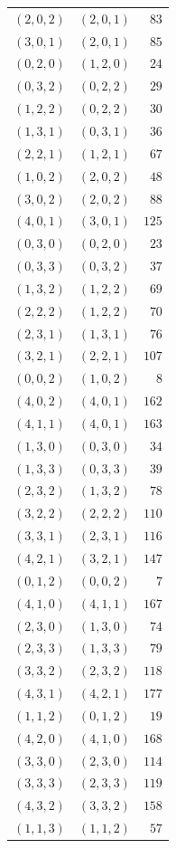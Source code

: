 \begin{longtable}{@{}rrr@{}}
$(2,0,2)$ & $(2,0,1)$ & $83$\\
$(3,0,1)$ & $(2,0,1)$ & $85$\\
$(0,2,0)$ & $(1,2,0)$ & $24$\\
$(0,3,2)$ & $(0,2,2)$ & $29$\\
$(1,2,2)$ & $(0,2,2)$ & $30$\\
$(1,3,1)$ & $(0,3,1)$ & $36$\\
$(2,2,1)$ & $(1,2,1)$ & $67$\\
$(1,0,2)$ & $(2,0,2)$ & $48$\\
$(3,0,2)$ & $(2,0,2)$ & $88$\\
$(4,0,1)$ & $(3,0,1)$ & $125$\\
$(0,3,0)$ & $(0,2,0)$ & $23$\\
$(0,3,3)$ & $(0,3,2)$ & $37$\\
$(1,3,2)$ & $(1,2,2)$ & $69$\\
$(2,2,2)$ & $(1,2,2)$ & $70$\\
$(2,3,1)$ & $(1,3,1)$ & $76$\\
$(3,2,1)$ & $(2,2,1)$ & $107$\\
$(0,0,2)$ & $(1,0,2)$ & $8$\\
$(4,0,2)$ & $(4,0,1)$ & $162$\\
$(4,1,1)$ & $(4,0,1)$ & $163$\\
$(1,3,0)$ & $(0,3,0)$ & $34$\\
$(1,3,3)$ & $(0,3,3)$ & $39$\\
$(2,3,2)$ & $(1,3,2)$ & $78$\\
$(3,2,2)$ & $(2,2,2)$ & $110$\\
$(3,3,1)$ & $(2,3,1)$ & $116$\\
$(4,2,1)$ & $(3,2,1)$ & $147$\\
$(0,1,2)$ & $(0,0,2)$ & $7$\\
$(4,1,0)$ & $(4,1,1)$ & $167$\\
$(2,3,0)$ & $(1,3,0)$ & $74$\\
$(2,3,3)$ & $(1,3,3)$ & $79$\\
$(3,3,2)$ & $(2,3,2)$ & $118$\\
$(4,3,1)$ & $(4,2,1)$ & $177$\\
$(1,1,2)$ & $(0,1,2)$ & $19$\\
$(4,2,0)$ & $(4,1,0)$ & $168$\\
$(3,3,0)$ & $(2,3,0)$ & $114$\\
$(3,3,3)$ & $(2,3,3)$ & $119$\\
$(4,3,2)$ & $(3,3,2)$ & $158$\\
$(1,1,3)$ & $(1,1,2)$ & $57$\\

\end{longtable}
